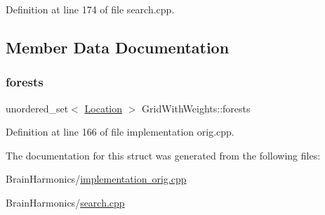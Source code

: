 Definition at line 174 of file search.\+cpp.



\subsection{Member Data Documentation}
\mbox{\label{struct_grid_with_weights_a03137c824b8c63cdeed414ef40f5b504}} 
\subsubsection{\texorpdfstring{forests}{forests}}
{\footnotesize\ttfamily unordered\+\_\+set$<$ \mbox{\hyperlink{struct_square_grid_a2c9a2cbd3912aa48ac97289abc3f1c0f}{Location}} $>$ Grid\+With\+Weights\+::forests}



Definition at line 166 of file implementation orig.\+cpp.



The documentation for this struct was generated from the following files\+:\begin{DoxyCompactItemize}
\item 
Brain\+Harmonics/\mbox{\hyperlink{implementation_01orig_8cpp}{implementation orig.\+cpp}}\item 
Brain\+Harmonics/\mbox{\hyperlink{search_8cpp}{search.\+cpp}}\end{DoxyCompactItemize}
